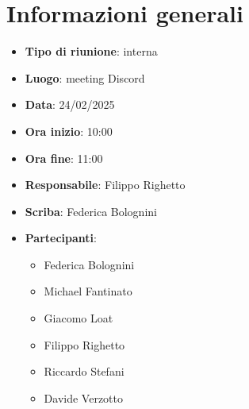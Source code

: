 


\section{Informazioni generali}

\begin{itemize}
    \item \textbf{Tipo di riunione}: interna
    \item \textbf{Luogo}: meeting Discord
    \item \textbf{Data}: 24/02/2025
    \item \textbf{Ora inizio}: 10:00
    \item \textbf{Ora fine}: 11:00
    \item \textbf{Responsabile}: Filippo Righetto
    \item \textbf{Scriba}: Federica Bolognini
    \item \textbf{Partecipanti}:
    \begin{itemize}
        \item Federica Bolognini
        \item Michael Fantinato
        \item Giacomo Loat
        \item Filippo Righetto
        \item Riccardo Stefani
        \item Davide Verzotto
    \end{itemize}
\end{itemize}
